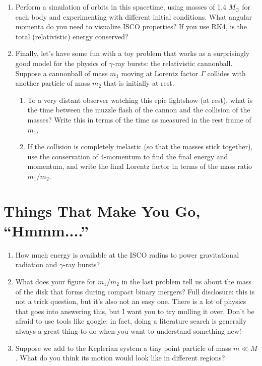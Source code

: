 \documentclass[11pt]{article}
\begin{document}
\begin{enumerate}
\item Perform a simulation of orbits in this spacetime, using masses of 1.4 $M_{\odot}$ for each body and experimenting with different initial conditions. What angular momenta do you need to visualize ISCO properties? If you use RK4, is the total (relativistic) energy conserved?

\item Finally, let's have some fun with a toy problem that works as a surprisingly good model for the physics of $\gamma$-ray bursts: the relativistic cannonball. Suppose a cannonball of mass $m_1$ moving at Lorentz factor $\Gamma$ collides with another particle of mass $m_2$ that is initially at rest.
\begin{enumerate}
\item To a very distant observer watching this epic lightshow (at rest), what is the time between the muzzle flash of the cannon and the collision of the masses? Write this in terms of the time as measured in the rest frame of $m_1$.

\item If the collision is completely inelastic (so that the masses stick together), use the conservation of 4-momentum to find the final energy and momentum, and write the final Lorentz factor in terms of the mass ratio $m_1/m_2$.
\end{enumerate}

\end{enumerate}


\section*{Things That Make You Go, ``Hmmm....''}

\begin{enumerate}

\item How much energy is available at the ISCO radius to power gravitational radiation and $\gamma$-ray bursts?

\item What does your figure for $m_1/m_2$ in the last problem tell us about the mass of the disk that forms during compact binary mergers? Full disclosure: this is not a trick question, but it's also not an easy one. There is a lot of physics that goes into answering this, but I want you to try mulling it over. Don't be afraid to use tools like google; in fact, doing a literature search is generally always a great thing to do when you want to understand something new!

\item Suppose we add to the Keplerian system a tiny point particle of mass $m \ll M$. What do you think its motion would look like in different regions?

\end{enumerate}

\end{document}

